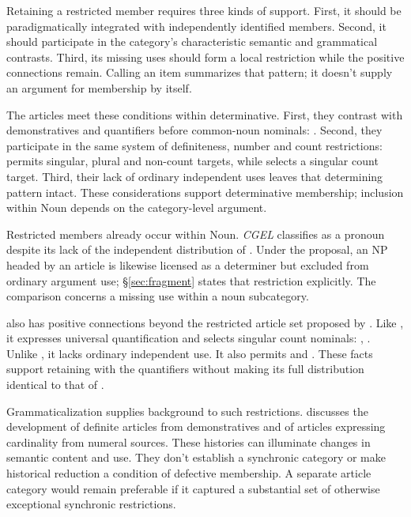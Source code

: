 \documentclass[12pt]{article}
\begin{document}
Retaining a restricted member requires three kinds of support. First, it should be paradigmatically integrated with independently identified members. Second, it should participate in the category's characteristic semantic and grammatical contrasts. Third, its missing uses should form a local restriction while the positive connections remain. Calling an item  summarizes that pattern; it doesn't supply an argument for membership by itself.

The articles meet these conditions within determinative. First, they contrast with demonstratives and quantifiers before common-noun nominals: . Second, they participate in the same system of definiteness, number and count restrictions:  permits singular, plural and non-count targets, while  selects a singular count target. Third, their lack of ordinary independent uses leaves that determining pattern intact. These considerations support determinative membership; inclusion within Noun depends on the category-level argument.

Restricted members already occur within Noun. \textit{CGEL} classifies  as a pronoun despite its lack of the independent distribution of  \citep[470--471]{huddleston2002}. Under the proposal, an NP headed by an article is likewise licensed as a determiner but excluded from ordinary argument use; §\ref{sec:fragment} states that restriction explicitly. The comparison concerns a missing use within a noun subcategory.

 also has positive connections beyond the restricted article set proposed by \textcite{spinillo2004reconceptualising}. Like , it expresses universal quantification and selects singular count nominals: , . Unlike , it lacks ordinary independent use. It also permits  and . These facts support retaining  with the quantifiers without making its full distribution identical to that of .

Grammaticalization supplies background to such restrictions. \textcite[331--336]{lyons1999} discusses the development of definite articles from demonstratives and of articles expressing cardinality from numeral sources. These histories can illuminate changes in semantic content and use. They don't establish a synchronic category or make historical reduction a condition of defective membership. A separate article category would remain preferable if it captured a substantial set of otherwise exceptional synchronic restrictions.
\end{document}
